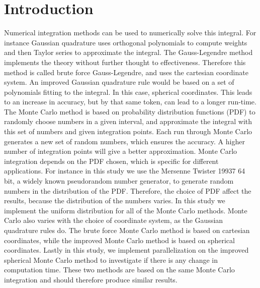 \documentclass{article}
\begin{document}
\vspace{1cm}

\tableofcontents

\vspace{1cm}

\vspace{1cm}

\section{Introduction} \label{sec:Introduction}

Numerical integration methods can be used to numerically solve this integral. For instance Gaussian quadrature uses orthogonal polynomials to compute weights and then Taylor series to approximate the integral. The Gauss-Legendre method implements the theory without further thought to effectiveness. Therefore this method is called brute force Gauss-Legendre, and uses the cartesian coordinate system. An improved Gaussian quadrature rule would be based on a set of polynomials fitting to the integral. In this case, spherical coordinates. This leads to an increase in accuracy, but by that same token, can lead to a longer run-time. The Monte Carlo method is based on probability distribution functions (PDF) to randomly choose numbers in a given interval, and approximate the integral with this set of numbers and given integration points. Each run through Monte Carlo generates a new set of random numbers, which ensures the accuracy. A higher number of integration points will give a better approximation. Monte Carlo integration depends on the PDF chosen, which is specific for different applications. For instance in this study we use the Mersenne Twister 19937 64 bit, a widely known pseudorandom number generator, to generate random numbers in the distribution of the PDF. Therefore, the choice of PDF affect the results, because the distribution of the numbers varies. In this study we implement the uniform distribution for all of the Monte Carlo methods. Monte Carlo also varies with the choice of coordinate system, as the Gaussian quadrature rules do. The brute force Monte Carlo method is based on cartesian coordinates, while the improved Monte Carlo method is based on spherical coordinates. Lastly in this study, we implement parallelization on the improved spherical Monte Carlo method to investigate if there is any change in computation time. These two methods are based on the same Monte Carlo integration and should therefore produce similar results. \\
\end{document}
